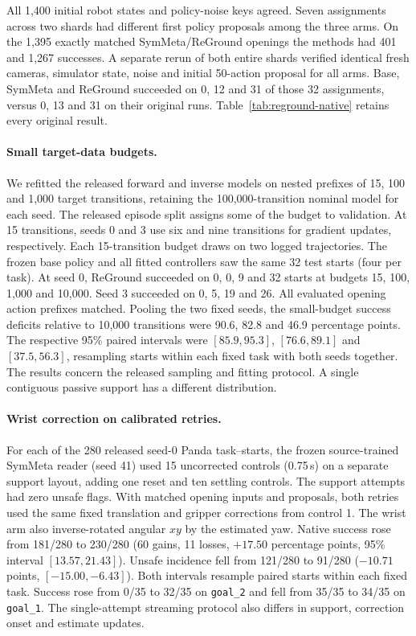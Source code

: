 \documentclass{article}
\theoremstyle{plain}
\theoremstyle{remark}
\begin{document}
All 1,400 initial robot states and policy-noise keys agreed. Seven assignments across two shards had different first policy proposals among the three arms. On the 1,395 exactly matched SymMeta/ReGround openings the methods had 401 and 1,267 successes. A separate rerun of both entire shards verified identical fresh cameras, simulator state, noise and initial 50-action proposal for all arms. Base, SymMeta and ReGround succeeded on 0, 12 and 31 of those 32 assignments, versus 0, 13 and 31 on their original runs. Table~\ref{tab:reground-native} retains every original result.

\paragraph{Small target-data budgets.} We refitted the released forward and inverse models on nested prefixes of 15, 100 and 1,000 target transitions, retaining the 100,000-transition nominal model for each seed. The released episode split assigns some of the budget to validation. At 15 transitions, seeds 0 and 3 use six and nine transitions for gradient updates, respectively. Each 15-transition budget draws on two logged trajectories. The frozen base policy and all fitted controllers saw the same 32 test starts (four per task). At seed 0, ReGround succeeded on 0, 0, 9 and 32 starts at budgets 15, 100, 1,000 and 10,000. Seed 3 succeeded on 0, 5, 19 and 26. All evaluated opening action prefixes matched. Pooling the two fixed seeds, the small-budget success deficits relative to 10,000 transitions were 90.6, 82.8 and 46.9 percentage points. The respective 95\% paired intervals were $[85.9,95.3]$, $[76.6,89.1]$ and $[37.5,56.3]$, resampling starts within each fixed task with both seeds together. The results concern the released sampling and fitting protocol. A single contiguous passive support has a different distribution.

\paragraph{Wrist correction on calibrated retries.} For each of the 280 released seed-0 Panda task--starts, the frozen source-trained SymMeta reader (seed 41) used 15 uncorrected controls (0.75\,s) on a separate support layout, adding one reset and ten settling controls. The support attempts had zero unsafe flags. With matched opening inputs and proposals, both retries used the same fixed translation and gripper corrections from control 1. The wrist arm also inverse-rotated angular $xy$ by the estimated yaw. Native success rose from 181/280 to 230/280 (60 gains, 11 losses, $+17.50$ percentage points, 95\% interval $[13.57,21.43]$). Unsafe incidence fell from 121/280 to 91/280 ($-10.71$ points, $[-15.00,-6.43]$). Both intervals resample paired starts within each fixed task. Success rose from 0/35 to 32/35 on \texttt{goal\_2} and fell from 35/35 to 34/35 on \texttt{goal\_1}. The single-attempt streaming protocol also differs in support, correction onset and estimate updates.
\end{document}
